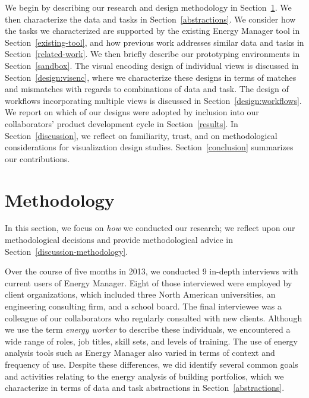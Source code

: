 \documentclass[journal]{vgtc}                %
\newcommand{\bstart}[1]{\vspace{1mm} \noindent{\textbf{#1:}}}
\begin{document}
\bstart{Outline} We begin by describing our research and design methodology in Section~\ref{methodology}.
We then characterize the data and tasks in Section~\ref{abstractions}.
We consider how the tasks we characterized are supported by the existing Energy Manager tool in Section~\ref{existing-tool}, and how previous work addresses similar data and tasks in Section~\ref{related-work}.
We then briefly describe our prototyping environments in Section~\ref{sandbox}.
The visual encoding design of individual views is discussed in Section~\ref{design:visenc}, where we characterize these designs in terms of matches and mismatches with regards to combinations of data and task.
The design of workflows incorporating multiple views is discussed in Section~\ref{design:workflows}.
We report on which of our designs were adopted by inclusion into our collaborators' product development cycle in Section~\ref{results}.
In Section~\ref{discussion}, we reflect on familiarity, trust, and on methodological considerations for visualization design studies.
Section~\ref{conclusion} summarizes our contributions.


\section{Methodology}
\label{methodology}


In this section, we focus on {\it how} we conducted our research; we reflect upon our methodological decisions and provide methodological advice in Section~\ref{discussion-methodology}. 

\bstart{Analyzing the work domain}
Over the course of five months in 2013, we conducted 9 in-depth interviews with current users of Energy Manager.
Eight of those interviewed were employed by client organizations, which included three North American universities, an engineering consulting firm, and a school board. 
The final interviewee was a colleague of our collaborators who regularly consulted with new clients.  
Although we use the term {\it energy worker} to describe these individuals, we encountered a wide range of roles, job titles, skill sets, and levels of training. 
The use of energy analysis tools such as Energy Manager also varied in terms of context and frequency of use.
Despite these differences, we did identify several common goals and activities relating to the energy analysis of building portfolios, which we characterize in terms of data and task abstractions in Section~\ref{abstractions}.
\end{document}
